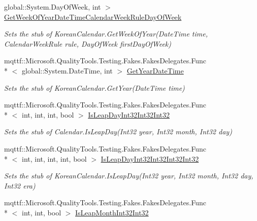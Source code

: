 \begin{DoxyCompactItemize}
global\-::\-System.\-Day\-Of\-Week, int $>$ \hyperlink{class_system_1_1_globalization_1_1_fakes_1_1_stub_korean_calendar_a19137b8a20df4160b3ada439838f169c}{Get\-Week\-Of\-Year\-Date\-Time\-Calendar\-Week\-Rule\-Day\-Of\-Week}
\begin{DoxyCompactList}\small\item\em Sets the stub of Korean\-Calendar.\-Get\-Week\-Of\-Year(\-Date\-Time time, Calendar\-Week\-Rule rule, Day\-Of\-Week first\-Day\-Of\-Week)\end{DoxyCompactList}\item 
mqttf\-::\-Microsoft.\-Quality\-Tools.\-Testing.\-Fakes.\-Fakes\-Delegates.\-Func\\*
$<$ global\-::\-System.\-Date\-Time, int $>$ \hyperlink{class_system_1_1_globalization_1_1_fakes_1_1_stub_korean_calendar_a9571fde9b6e0c267a7cc9726dab30478}{Get\-Year\-Date\-Time}
\begin{DoxyCompactList}\small\item\em Sets the stub of Korean\-Calendar.\-Get\-Year(\-Date\-Time time)\end{DoxyCompactList}\item 
mqttf\-::\-Microsoft.\-Quality\-Tools.\-Testing.\-Fakes.\-Fakes\-Delegates.\-Func\\*
$<$ int, int, int, bool $>$ \hyperlink{class_system_1_1_globalization_1_1_fakes_1_1_stub_korean_calendar_a9ce10d5f6cc77ee3c55a4c51c40cec95}{Is\-Leap\-Day\-Int32\-Int32\-Int32}
\begin{DoxyCompactList}\small\item\em Sets the stub of Calendar.\-Is\-Leap\-Day(\-Int32 year, Int32 month, Int32 day)\end{DoxyCompactList}\item 
mqttf\-::\-Microsoft.\-Quality\-Tools.\-Testing.\-Fakes.\-Fakes\-Delegates.\-Func\\*
$<$ int, int, int, int, bool $>$ \hyperlink{class_system_1_1_globalization_1_1_fakes_1_1_stub_korean_calendar_ad77ff207751b7c56e2f637679b40a454}{Is\-Leap\-Day\-Int32\-Int32\-Int32\-Int32}
\begin{DoxyCompactList}\small\item\em Sets the stub of Korean\-Calendar.\-Is\-Leap\-Day(\-Int32 year, Int32 month, Int32 day, Int32 era)\end{DoxyCompactList}\item 
mqttf\-::\-Microsoft.\-Quality\-Tools.\-Testing.\-Fakes.\-Fakes\-Delegates.\-Func\\*
$<$ int, int, bool $>$ \hyperlink{class_system_1_1_globalization_1_1_fakes_1_1_stub_korean_calendar_a188034cc9c39f0e6309b4f73d0cfed2b}{Is\-Leap\-Month\-Int32\-Int32}

\end{DoxyCompactItemize}
